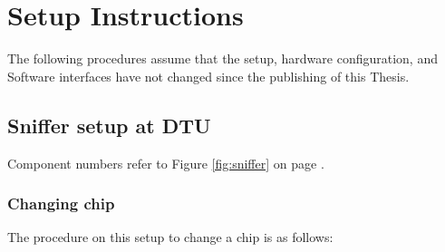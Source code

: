 
\chapter{Setup Instructions}\label{app:instructions}

The following procedures assume that the setup, hardware configuration, and Software interfaces have not changed since the publishing of this Thesis.

\section{Sniffer setup at DTU}\label{app:sniffer}

Component numbers refer to Figure \ref{fig:sniffer} on page \pageref{fig:sniffer}.

\subsection{Changing chip}
The procedure on this setup to change a chip is as follows:
